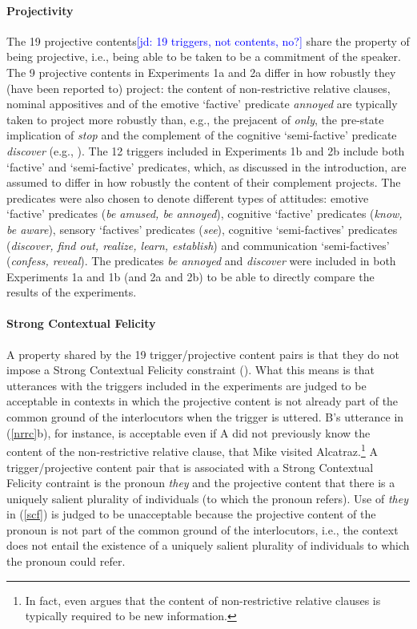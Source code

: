 \documentclass[11pt,fleqn]{article}
\newcommand{\6}{\mbox{$[\hspace*{-.6mm}[$}}
\newcommand{\9}{\mbox{$]\hspace*{-.6mm}]$}}
\newcommand{\jd}[1]{\textcolor{Blue}{[jd: #1]}}
\begin{document}
\paragraph{Projectivity} The 19 projective contents\jd{19 triggers, not contents, no?} share the property of being projective, i.e., being able to be taken to be a commitment of the speaker. The 9 projective contents in Experiments 1a and 2a differ in how robustly they (have been reported to) project: the content of non-restrictive relative clauses, nominal appositives and of the emotive `factive' predicate {\em annoyed} are typically taken to project more robustly than, e.g., the prejacent of {\em only}, the pre-state implication of {\em stop} and the complement of the cognitive `semi-factive' predicate {\em discover} (e.g., \citealt{karttunen71b,simons01,potts05,abusch10,beaver-belly}). The 12 triggers included in Experiments 1b and 2b include both `factive' and `semi-factive' predicates, which, as discussed in the introduction, are assumed to differ in how robustly the content of their complement projects. The predicates were also chosen to denote different types of attitudes: emotive `factive' predicates ({\em be amused, be annoyed}), cognitive `factive' predicates ({\em know, be aware}), sensory `factives' predicates ({\em see}), cognitive `semi-factives' predicates ({\em discover, find out, realize, learn, establish}) and communication `semi-factives' ({\em confess, reveal}). The predicates {\em be annoyed} and {\em discover} were included in both Experiments 1a and 1b (and 2a and 2b) to be able to directly compare the results of the experiments.

\paragraph{Strong Contextual Felicity} A property shared by the 19 trigger/projective content pairs is that they do not impose a Strong Contextual Felicity constraint (\citealt{brst-lang11}). What this means is that utterances with the triggers included in the experiments are judged to be acceptable in contexts in which the projective content is not already part of the common ground of the interlocutors when the trigger is uttered. B's utterance in (\ref{nrrc}b), for instance, is acceptable even if A did not previously know the content of the non-restrictive relative clause, that Mike visited Alcatraz.\footnote{In fact, \citealt{potts05} even argues that the content of non-restrictive relative clauses is typically required to be new information.} A trigger/projective content pair that is associated with a Strong Contextual Felicity contraint is the pronoun {\em they} and the projective content that there is a uniquely salient plurality of individuals (to which the pronoun refers). Use of {\em they} in (\ref{scf}) is judged to be unacceptable because the projective content of the pronoun is not part of the common ground of the interlocutors, i.e., the context does not entail the existence of a uniquely salient plurality of individuals to which the pronoun could refer. 
\end{document}
